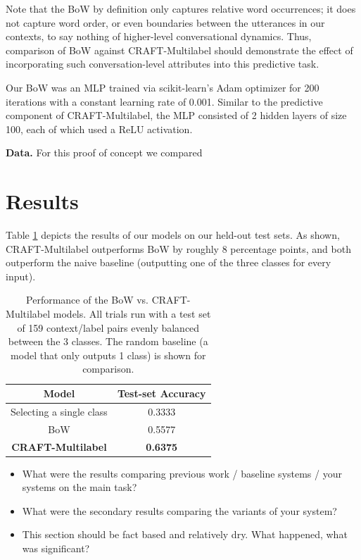 \documentclass{article}
\begin{document}
Note that the BoW by definition only captures relative word occurrences; it does not capture word order, or even boundaries between the utterances in our contexts, to say nothing of higher-level conversational dynamics. Thus, comparison of BoW against CRAFT-Multilabel should demonstrate the effect of incorporating such conversation-level attributes into this predictive task.

Our BoW was an MLP trained via scikit-learn's Adam optimizer \cite{scikit-learn} for 200 iterations with a constant learning rate of 0.001. Similar to the predictive component of CRAFT-Multilabel, the MLP consisted of 2 hidden layers of size 100, each of which used a ReLU activation.

\textbf{Data.} For this proof of concept we compared 


\section{Results}
\label{sec:results}

Table \ref{tab:results} depicts the results of our models on our held-out test sets. As shown, CRAFT-Multilabel outperforms BoW by roughly 8 percentage points, and both outperform the naive baseline (outputting one of the three classes for every input). 

\begin{table}[t]
  \centering
  \begin{tabular}{@{}cc@{}}
  \toprule
  \textbf{Model}            & \textbf{Test-set Accuracy} \\ \midrule
  Selecting a single class           & 0.3333                           \\
  BoW                       & 0.5577                           \\
  \textbf{CRAFT-Multilabel} & \textbf{0.6375}                  \\ \bottomrule
  \end{tabular}
  \caption{Performance of the BoW vs. CRAFT-Multilabel models. All trials run with a test set of 159 context/label pairs evenly balanced between the 3 classes. The random baseline (a model that only outputs 1 class) is shown for comparison.}
  \label{tab:results}
\end{table}

\begin{itemize}
\item What were the results comparing previous work / baseline systems / your systems on the main task?
\item What were the secondary results comparing the variants of your system?
\item This section should be fact based and relatively dry. What happened, what was significant?
\end{itemize}
\end{document}
